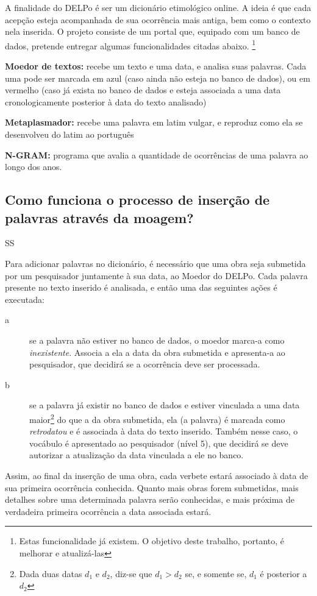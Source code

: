 A finalidade do DELPo é ser um dicionário etimológico online. A ideia é que cada acepção
esteja acompanhada de sua ocorrência mais antiga, bem como o contexto nela inserida. O
projeto consiste de um portal que, equipado com um banco de dados, pretende entregar algumas
funcionalidades citadas abaixo. \footnote{Estas funcionalidade já existem. O objetivo deste
trabalho, portanto, é melhorar e atualizá-las}

\textbf{Moedor de textos:} recebe um texto e uma data, e analisa suas palavras. Cada uma pode
ser marcada em azul (caso ainda não esteja no banco de dados), ou em vermelho (caso já exista
no banco de dados e esteja associada a uma data cronologicamente posterior à data do texto
analisado)

\textbf{Metaplasmador:} recebe uma palavra em latim vulgar, e reproduz como ela se desenvolveu
do latim ao português

\textbf{N-GRAM:} programa que avalia a quantidade de ocorrências de uma palavra ao longo dos
anos.

\subsection{Como funciona o processo de inserção de palavras através da moagem?}
\label{subsec:moagem}SS

Para adicionar palavras no dicionário, é necessário que uma obra seja submetida
por um pesquisador juntamente à sua data, ao Moedor do DELPo. Cada palavra presente
no texto inserido é analisada, e então uma das seguintes ações é executada:
\begin{description}
    \item[a]  se a palavra não estiver no banco de dados, o moedor marca-a como
    \emph{inexistente}. Associa a ela a data da obra submetida e apresenta-a ao
    pesquisador, que decidirá se a ocorrência deve ser processada.
    \item[b] se a palavra já existir no banco de dados e estiver vinculada a uma
    data maior\footnote{Dada duas datas $d_1$ e $d_2$, diz-se que $d_1 > d_2$ se,
    e somente se, $d_1$ é posterior a $d_2$} do que a da obra submetida, ela (a
    palavra) é marcada como \emph{retrodatou} e é associada à data do texto
    inserido. Também nesse caso, o vocábulo é apresentado ao pesquisador (nível
    5), que decidirá se deve autorizar a atualização da data vinculada a ele no banco.
\end{description}

Assim, ao final da inserção de uma obra, cada verbete estará associado à data de
sua primeira ocorrência conhecida. Quanto mais obras forem submetidas, mais detalhes
sobre uma determinada palavra serão conhecidas, e mais próxima de verdadeira
primeira ocorrência a data associada estará.

